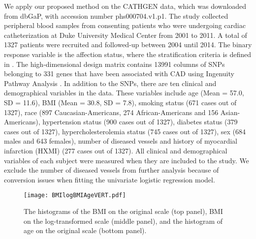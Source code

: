 \documentclass[11pt]{article}
\begin{document}
We apply our proposed method on the CATHGEN data, which was downloaded from dbGaP, with accession number phs000704.v1.p1. The study collected peripheral blood samples from consenting patients who were undergoing cardiac catheterization at Duke University Medical Center from 2001 to 2011. A total of 1327 patients were recruited and followed-up between 2004 until 2014. The binary response variable is the affection status, where the stratification criteria is defined in \cite{shah2010reclass}. The high-dimensional design matrix contains 13991 columns of SNPs belonging to 331 genes that have been associated with CAD using Ingenuity Pathway Analysis \citep{kramer2014causal}. In addition to the SNPs, there are ten clinical and demographical variables in the data. These variables include age (Mean = 57.0, SD = 11.6), BMI (Mean = 30.8, SD = 7.8), smoking status (671 cases out of 1327), race (897 Caucasian-Americans, 274 African-Americans and 156 Asian-Americans), hypertension status (900 cases out of 1327), diabetes status (379 cases out of 1327), hypercholesterolemia status (745 cases out of 1327), sex (684 males and 643 females), number of diseased vessels and history of myocardial infarction (HXMI) (277 cases out of 1327). All clinical and demographical variables of each subject were measured when they are included to the study. We exclude the number of diseased vessels from further analysis because of conversion issues when fitting the univariate logistic regression model.

\begin{figure}
\centering
\centerline{\texttt{[image: BMIlogBMIAgeVERT.pdf]}}
\caption{The histograms of the BMI on the original scale (top panel), BMI on the log-transformed scale (middle panel), and the histogram of age on the original scale (bottom panel). } \label{HIST}
\end{figure}
\end{document}
